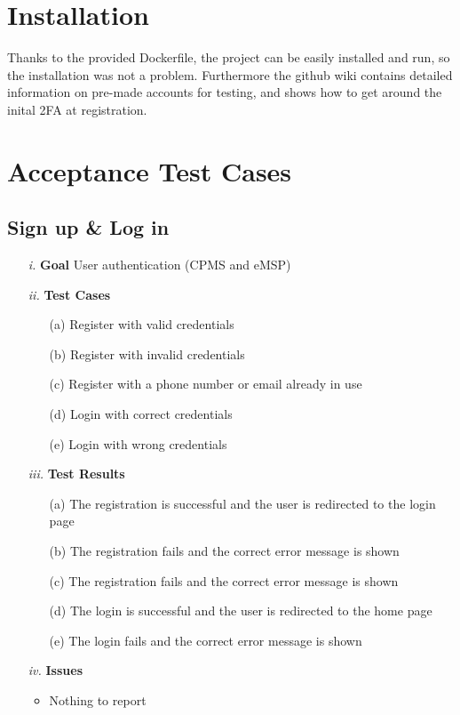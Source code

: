 \documentclass[table, 12pt]{article}
\begin{document}
\section{Installation}
Thanks to the provided Dockerfile, the project can be easily installed and run, so the installation was not a problem. Furthermore the github wiki contains detailed information on 
pre-made accounts for testing, and shows how to get around the inital 2FA at registration.

\section{Acceptance Test Cases}

\subsection{Sign up \& Log in}
\begin{itemize}
    \item[\textit{i.}] \textbf{Goal} User authentication (CPMS and eMSP)
    \item[\textit{ii.}] \textbf{Test Cases}
    \begin{itemize}
        \item[(a)] Register with valid credentials
        \item[(b)] Register with invalid credentials
        \item[(c)] Register with a phone number or email already in use
        \item[(d)] Login with correct credentials
        \item[(e)] Login with wrong credentials
    \end{itemize} 
    \item[\textit{iii.}] \textbf{Test Results}
    \begin{itemize}
        \item[(a)] The registration is successful and the user is redirected to the login page
        \item[(b)] The registration fails and the correct error message is shown
        \item[(c)] The registration fails and the correct error message is shown
        \item[(d)] The login is successful and the user is redirected to the home page
        \item[(e)] The login fails and the correct error message is shown
    \end{itemize} 
    \item[\textit{iv.}] \textbf{Issues}    
    \begin{itemize}
        \item Nothing to report
    \end{itemize} 
\end{itemize}
\end{document}

